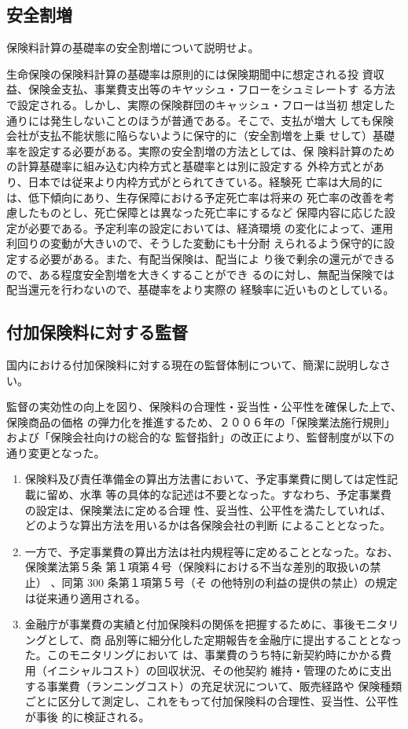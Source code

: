 \documentclass[report,gutter=10mm,fore-edge=10mm,uplatex,dvipdfmx]{jlreq}
\begin{document}
\subsection{安全割増}
保険料計算の基礎率の安全割増について説明せよ。

生命保険の保険料計算の基礎率は原則的には保険期聞中に想定される投
資収益、保険金支払、事業費支出等のキヤッシュ・フローをシュミレートす
る方法で設定される。しかし、実際の保険群団のキャッシュ・フローは当初
想定した通りには発生しないことのほうが普通である。そこで、支払が増大
しても保険会社が支払不能状態に陥らないように保守的に（安全割増を上乗
せして）基礎率を設定する必要がある。実際の安全割増の方法としては、保
険料計算のための計算基礎率に組み込む内枠方式と基礎率とは別に設定する
外枠方式とがあり、日本では従来より内枠方式がとられてきている。経験死
亡率は大局的には、低下傾向にあり、生存保障における予定死亡率は将来の
死亡率の改善を考慮したものとし、死亡保障とは異なった死亡率にするなど
保障内容に応じた設定が必要である。予定利率の設定においては、経済環境
の変化によって、運用利回りの変動が大きいので、そうした変動にも十分耐
えられるよう保守的に設定する必要がある。また、有配当保険は、配当によ
り後で剰余の還元ができるので、ある程度安全割増を大きくすることができ
るのに対し、無配当保険では配当還元を行わないので、基礎率をより実際の
経験率に近いものとしている。

\subsection{付加保険料に対する監督}


国内における付加保険料に対する現在の監督体制について、簡潔に説明しなさい。



監督の実効性の向上を図り、保険料の合理性・妥当性・公平性を確保した上で、保険商品の価格
の弾力化を推進するため、２００６年の「保険業法施行規則」および「保険会社向けの総合的な
監督指針」の改正により、監督制度が以下の通り変更となった。
\begin{enumerate}
 \item 保険料及び責任準備金の算出方法書において、予定事業費に関しては定性記載に留め、水準
等の具体的な記述は不要となった。すなわち、予定事業費の設定は、保険業法に定める合理
性、妥当性、公平性を満たしていれば、どのような算出方法を用いるかは各保険会社の判断
によることとなった。
 \item 一方で、予定事業費の算出方法は社内規程等に定めることとなった。なお、保険業法第５条
第１項第４号（保険料における不当な差別的取扱いの禁止）
、同第 300 条第１項第５号（そ
の他特別の利益の提供の禁止）の規定は従来通り適用される。
 \item 金融庁が事業費の実績と付加保険料の関係を把握するために、事後モニタリングとして、商
品別等に細分化した定期報告を金融庁に提出することとなった。このモニタリングにおいて
は、事業費のうち特に新契約時にかかる費用（イニシャルコスト）の回収状況、その他契約
維持・管理のために支出する事業費（ランニングコスト）の充足状況について、販売経路や
保険種類ごとに区分して測定し、これをもって付加保険料の合理性、妥当性、公平性が事後
的に検証される。
\end{enumerate}
\end{document}

